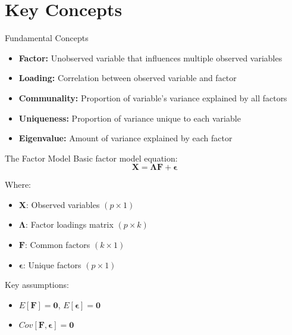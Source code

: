 \documentclass[aspectratio=169]{beamer}
\begin{document}
\section{Key Concepts}
\begin{frame}{Fundamental Concepts}
  \begin{itemize}
    \item \textbf{Factor:} Unobserved variable that influences multiple observed variables
    \item \textbf{Loading:} Correlation between observed variable and factor
    \item \textbf{Communality:} Proportion of variable's variance explained by all factors
    \item \textbf{Uniqueness:} Proportion of variance unique to each variable
    \item \textbf{Eigenvalue:} Amount of variance explained by each factor
  \end{itemize}
\end{frame}

\begin{frame}{The Factor Model}
  Basic factor model equation:
  $$\mathbf{X} = \mathbf{\Lambda F} + \mathbf{\epsilon}$$
  
  Where:
  \begin{itemize}
    \item $\mathbf{X}$: Observed variables $(p \times 1)$
    \item $\mathbf{\Lambda}$: Factor loadings matrix $(p \times k)$
    \item $\mathbf{F}$: Common factors $(k \times 1)$
    \item $\mathbf{\epsilon}$: Unique factors $(p \times 1)$
  \end{itemize}
  
  \vspace{0.3cm}
  Key assumptions:
  \begin{itemize}
    \item $E[\mathbf{F}] = \mathbf{0}$, $E[\mathbf{\epsilon}] = \mathbf{0}$
    \item $Cov[\mathbf{F}, \mathbf{\epsilon}] = \mathbf{0}$
  \end{itemize}
\end{frame}
\end{document}
